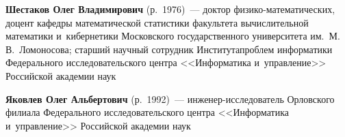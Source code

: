 \begin{multicols}{2}
\vspace*{3pt}

\noindent
\textbf{Шестаков Олег Владимирович} (р.\ 1976)~--- 
доктор фи\-зи\-ко-ма\-те\-ма\-ти\-че\-ских, доцент кафедры математической 
статистики факультета вычислительной математики и~кибернетики Московского\linebreak 
государственного университета им.\ М.\,В.~Ломоносова; старший научный сотрудник 
Института\linebreak проб\-лем информатики Федерального исследовательского центра 
<<Информатика и~управ\-ле\-ние>> Российской академии наук

\vspace*{3pt}


\noindent
\textbf{Яковлев Олег Альбертович} (р.\ 1992)~---
ин\-же\-нер-ис\-сле\-до\-ва\-тель Орловского филиала Федерального исследовательского 
центра <<Информатика и~управ\-ле\-ние>> Российской академии наук


 \label{end\stat}










\end{multicols}

\newpage